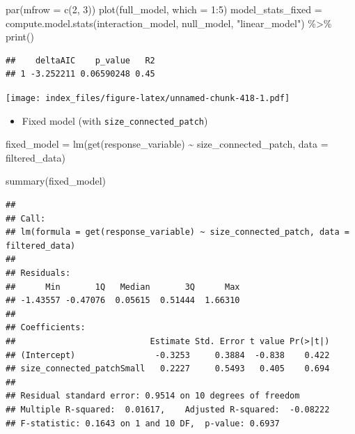 \documentclass[
]{article}
\newenvironment{Shaded}{\begin{snugshade}}{\end{snugshade}}
\newcommand{\AttributeTok}[1]{\textcolor[rgb]{0.77,0.63,0.00}{#1}}
\newcommand{\DecValTok}[1]{\textcolor[rgb]{0.00,0.00,0.81}{#1}}
\newcommand{\FunctionTok}[1]{\textcolor[rgb]{0.00,0.00,0.00}{#1}}
\newcommand{\NormalTok}[1]{#1}
\newcommand{\OtherTok}[1]{\textcolor[rgb]{0.56,0.35,0.01}{#1}}
\newcommand{\SpecialCharTok}[1]{\textcolor[rgb]{0.00,0.00,0.00}{#1}}
\newcommand{\StringTok}[1]{\textcolor[rgb]{0.31,0.60,0.02}{#1}}
\providecommand{\tightlist}{%
  \setlength{\itemsep}{0pt}\setlength{\parskip}{0pt}}
\begin{document}
\begin{Shaded}
\begin{Highlighting}[]
\FunctionTok{par}\NormalTok{(}\AttributeTok{mfrow =} \FunctionTok{c}\NormalTok{(}\DecValTok{2}\NormalTok{, }\DecValTok{3}\NormalTok{))}
\FunctionTok{plot}\NormalTok{(full\_model, }\AttributeTok{which =} \DecValTok{1}\SpecialCharTok{:}\DecValTok{5}\NormalTok{)}
\NormalTok{model\_stats\_fixed }\OtherTok{=} \FunctionTok{compute.model.stats}\NormalTok{(interaction\_model,}
\NormalTok{                                        null\_model,}
                                        \StringTok{"linear\_model"}\NormalTok{) }\SpecialCharTok{\%\textgreater{}\%}
  \FunctionTok{print}\NormalTok{()}
\end{Highlighting}
\end{Shaded}

\begin{verbatim}
##    deltaAIC    p_value   R2
## 1 -3.252211 0.06590248 0.45
\end{verbatim}

\texttt{[image: index\_files/figure-latex/unnamed-chunk-418-1.pdf]}

\begin{itemize}
\tightlist
\item
  Fixed model (with \texttt{size\_connected\_patch})
\end{itemize}

\begin{Shaded}
\begin{Highlighting}[]
\NormalTok{fixed\_model }\OtherTok{=} \FunctionTok{lm}\NormalTok{(}\FunctionTok{get}\NormalTok{(response\_variable) }\SpecialCharTok{\textasciitilde{}}
\NormalTok{                   size\_connected\_patch,}
                 \AttributeTok{data =}\NormalTok{ filtered\_data)}

\FunctionTok{summary}\NormalTok{(fixed\_model)}
\end{Highlighting}
\end{Shaded}

\begin{verbatim}
## 
## Call:
## lm(formula = get(response_variable) ~ size_connected_patch, data = filtered_data)
## 
## Residuals:
##      Min       1Q   Median       3Q      Max 
## -1.43557 -0.47076  0.05615  0.51444  1.66310 
## 
## Coefficients:
##                           Estimate Std. Error t value Pr(>|t|)
## (Intercept)                -0.3253     0.3884  -0.838    0.422
## size_connected_patchSmall   0.2227     0.5493   0.405    0.694
## 
## Residual standard error: 0.9514 on 10 degrees of freedom
## Multiple R-squared:  0.01617,    Adjusted R-squared:  -0.08222 
## F-statistic: 0.1643 on 1 and 10 DF,  p-value: 0.6937
\end{verbatim}
\end{document}
